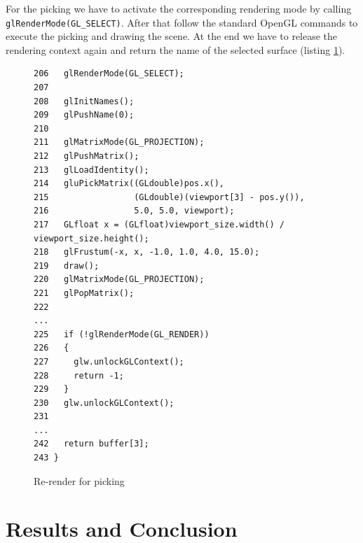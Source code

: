 \documentclass[jou,noapacite]{apa}
\renewcommand{\figurename}{Listing}
\begin{document}
For the picking we have to activate the corresponding rendering mode by
calling \lstinline|glRenderMode(GL_SELECT)|.
%
After that follow the standard OpenGL commands to execute the picking and
drawing the scene.
%
At the end we have to release the rendering context again and return the name
of the selected surface (listing \ref{lst:picking}).
%
\begin{figure}[h]
\begin{lstlisting}[basicstyle=\scriptsize]
206   glRenderMode(GL_SELECT);
207
208   glInitNames();
209   glPushName(0);
210
211   glMatrixMode(GL_PROJECTION);
212   glPushMatrix();
213   glLoadIdentity();
214   gluPickMatrix((GLdouble)pos.x(),
215                 (GLdouble)(viewport[3] - pos.y()),
216                 5.0, 5.0, viewport);
217   GLfloat x = (GLfloat)viewport_size.width() /               viewport_size.height();
218   glFrustum(-x, x, -1.0, 1.0, 4.0, 15.0);
219   draw();
220   glMatrixMode(GL_PROJECTION);
221   glPopMatrix();
222
...
225   if (!glRenderMode(GL_RENDER))
226   {
227     glw.unlockGLContext();
228     return -1;
229   }
230   glw.unlockGLContext();
231
...
242   return buffer[3];
243 }
\end{lstlisting}
\caption{Re-render for picking}
\label{lst:picking}
\end{figure}

\section{Results and Conclusion}

\renewcommand{\figurename}{Figure}
\setcounter{figure}{0}
\end{document}
